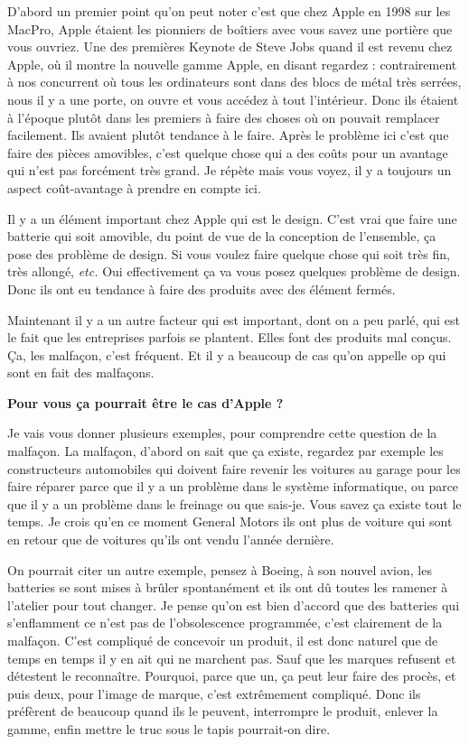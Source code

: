 \begin{small}
D'abord un premier point qu'on peut noter c'est que chez Apple en 1998 sur les MacPro, Apple étaient les pionniers de boîtiers avec vous savez une portière que vous ouvriez. Une des premières Keynote de Steve Jobs quand il est revenu chez Apple, où il montre la nouvelle gamme Apple, en disant regardez : contrairement à nos concurrent où tous les ordinateurs sont dans des blocs de métal très serrées, nous il y a une porte, on ouvre et vous accédez à tout l'intérieur. Donc ils étaient à l'époque plutôt dans les premiers à faire des choses où on pouvait remplacer facilement. Ils avaient plutôt tendance à le faire.
Après le problème ici c'est que faire des pièces amovibles, c'est quelque chose qui a des coûts pour un avantage qui n'est pas forcément très grand. Je répète mais vous voyez, il y a toujours un aspect coût-avantage à prendre en compte ici. 

Il y a un élément important chez Apple qui est le design. C'est vrai que faire une batterie qui soit amovible, du point de vue de la conception de l'ensemble, ça pose des problème de design. Si vous voulez faire quelque chose qui soit très fin, très allongé, \textit{etc.} Oui effectivement ça va vous posez quelques problème de design. Donc ils ont eu tendance à faire des produits avec des élément fermés.

Maintenant il y a un autre facteur qui est important, dont on a peu parlé, qui est le fait que les entreprises parfois se plantent. Elles font des produits mal conçus. Ça, les malfaçon, c'est fréquent. Et il y a beaucoup de cas qu'on appelle op qui sont en fait des malfaçons.

\textbf{Pour vous ça pourrait être le cas d'Apple ?}
\smallbreak


Je vais vous donner plusieurs exemples, pour comprendre cette question de la malfaçon. La malfaçon, d'abord on sait que ça existe, regardez par exemple les constructeurs automobiles qui doivent faire revenir les voitures au garage pour les faire réparer parce que il y a un problème dans le système informatique, ou parce que il y a un problème dans le freinage ou que sais-je. Vous savez ça existe tout le temps. Je crois qu'en ce moment General Motors ils ont plus de voiture qui sont en retour que de voitures qu'ils ont vendu l'année dernière. 

On pourrait citer un autre exemple, pensez à Boeing, à son nouvel avion, les batteries se sont mises à brûler spontanément et ils ont dû toutes les ramener à l'atelier pour tout changer. Je pense qu'on est bien d'accord que des batteries qui s'enflamment ce n'est pas de l'obsolescence programmée, c'est clairement de la malfaçon. C'est compliqué de concevoir un produit, il est donc naturel que de temps en temps il y en ait qui ne marchent pas. Sauf que les marques refusent et détestent le reconnaître. Pourquoi, parce que un, ça peut leur faire des procès, et puis deux, pour l'image de marque, c'est extrêmement compliqué. Donc ils préfèrent de beaucoup quand ils le peuvent, interrompre le produit, enlever la gamme, enfin \og mettre le truc sous le tapis\fg{} pourrait-on dire. 


\end{small}
